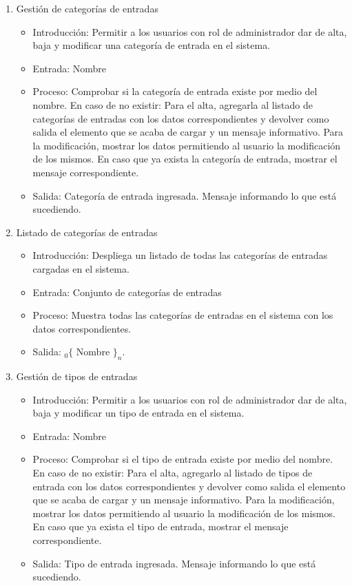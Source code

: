 \begin{enumerate}
			\item Gestión de categorías de entradas
				\begin{itemize}
					\item Introducción: Permitir a los usuarios con rol de administrador dar de alta, baja y modificar una categoría de entrada en el sistema.
					\item Entrada: Nombre
					\item Proceso: Comprobar si la categoría de entrada existe por medio del nombre. En caso de no existir: 
					Para el alta, agregarla al listado de categorías de entradas con los datos correspondientes y devolver como salida el elemento que se acaba de cargar y un mensaje informativo.
					Para la modificación, mostrar los datos permitiendo al usuario la modificación de los mismos.
					En caso que ya exista la categoría de entrada, mostrar el mensaje correspondiente.
					\item Salida: Categoría de entrada ingresada. Mensaje informando lo que está sucediendo.
				\end{itemize}
			
			\item Listado de categorías de entradas
				\begin{itemize}
					\item Introducción: Despliega un listado de todas las categorías de entradas cargadas en el sistema.
					\item Entrada: Conjunto de categorías de entradas
					\item Proceso: Muestra todas las categorías de entradas en el sistema con los datos correspondientes.
					\item Salida: ${}_{0}\{$ Nombre $\}_n$.
				\end{itemize}
				
			\item Gestión de tipos de entradas
				\begin{itemize}
					\item Introducción: Permitir a los usuarios con rol de administrador dar de alta, baja y modificar un tipo de entrada en el sistema.
					\item Entrada: Nombre
					\item Proceso: Comprobar si el tipo de entrada existe por medio del nombre. En caso de no existir: 
					Para el alta, agregarlo al listado de tipos de entrada con los datos correspondientes y devolver como salida el elemento que se acaba de cargar y un mensaje informativo.
					Para la modificación, mostrar los datos permitiendo al usuario la modificación de los mismos.
					En caso que ya exista el tipo de entrada, mostrar el mensaje correspondiente.
					\item Salida: Tipo de entrada ingresada. Mensaje informando lo que está sucediendo.
				\end{itemize}
			

\end{enumerate}
